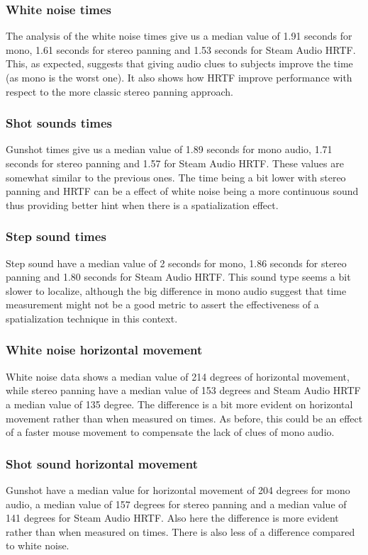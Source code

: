 \documentclass[conference]{IEEEtran}
\begin{document}
\subsubsection{White noise times}
The analysis of the white noise times give us a median value of 1.91 seconds for mono, 1.61 seconds for stereo panning and 1.53 seconds for Steam Audio HRTF. This, as expected, suggests that giving audio clues to subjects improve the time (as mono is the worst one). It also shows how HRTF improve performance with respect to the more classic stereo panning approach.\\

\subsubsection{Shot sounds times}
Gunshot times give us a median value of 1.89 seconds for mono audio, 1.71 seconds for stereo panning and 1.57 for Steam Audio HRTF. These values are somewhat similar to the previous ones. The time being a bit lower with stereo panning and HRTF can be a effect of white noise being a more continuous sound thus providing better hint when there is a spatialization effect.\\

\subsubsection{Step sound times}
Step sound have a median value of 2 seconds for mono, 1.86 seconds for stereo panning and 1.80 seconds for Steam Audio HRTF. This sound type seems a bit slower to localize, although the big difference in mono audio suggest that time measurement might not be a good metric to assert the effectiveness of a spatialization technique in this context.\\

\subsubsection{White noise horizontal movement}
White noise data shows a median value of 214 degrees of horizontal movement, while stereo panning have a median value of 153 degrees and Steam Audio HRTF a median value of 135 degree. The difference is a bit more evident on horizontal movement rather than when measured on times. As before, this could be an effect of a faster mouse movement to compensate the lack of clues of mono audio.\\

\subsubsection{Shot sound horizontal movement}
Gunshot have a median value for horizontal movement of 204 degrees for mono audio, a median value of 157 degrees for stereo panning and a median value of 141 degrees for Steam Audio HRTF. Also here the difference is more evident rather than when measured on times. There is also less of a difference compared to white noise.\\
\end{document}
